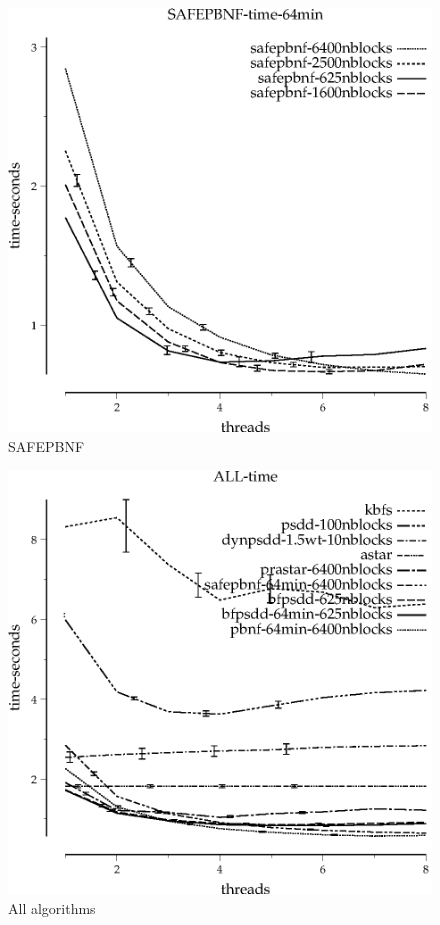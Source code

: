\documentclass{article}
\begin{document}
\begin{figure}
\begin{center}
\includegraphics{SAFEPBNF-time-64min}
\end{center}
\caption{SAFEPBNF}
\end{figure}

\begin{figure}
\begin{center}
\includegraphics{ALL-time}
\end{center}
\caption{All algorithms}
\end{figure}
\end{document}
